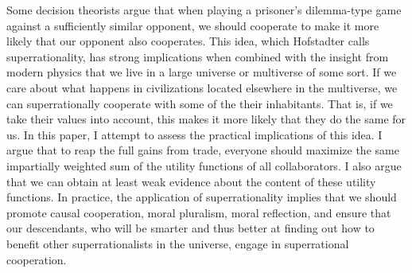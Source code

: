 Some decision theorists argue that when playing a prisoner's
dilemma-type game against a sufficiently similar opponent, we should
cooperate to make it more likely that our opponent also cooperates. This
idea, which Hofstadter calls superrationality, has strong implications
when combined with the insight from modern physics that we live in a
large universe or multiverse of some sort. If we care about what happens
in civilizations located elsewhere in the multiverse, we can
superrationally cooperate with some of the their inhabitants. That is,
if we take their values into account, this makes it more likely that
they do the same for us. In this paper, I attempt to assess the
practical implications of this idea. I argue that to reap the full gains
from trade, everyone should maximize the same impartially weighted sum
of the utility functions of all collaborators. I also argue that we can
obtain at least weak evidence about the content of these utility
functions. In practice, the application of superrationality implies that
we should promote causal cooperation, moral pluralism, moral reflection,
and ensure that our descendants, who will be smarter and thus better at
finding out how to benefit other superrationalists in the universe,
engage in superrational cooperation.


